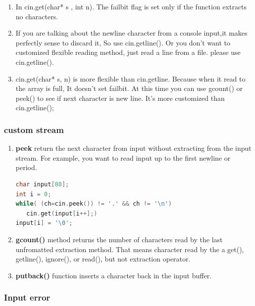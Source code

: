 \documentclass[a4paper,12pt,twoside]{book}
\begin{document}
\begin{itemize}
\begin{enumerate}
\item In cin.get(char* s ,  int n). The failbit flag is set only if the function extracts no characters.

\item If you are talking about the newline character from a console input,it makes perfectly sense to discard it, So use cin.getline(). Or you don't want to customized flexible reading method, just read a line from a file. please use cin.getline().

\item cin.get(char* s, n) is more flexible than cin.getline. Because when it read to the array is full, It doesn't set failbit. At this time you can use gcount() or peek() to see if next character is new line. It's more customized than  cin.getline();
\end{enumerate}

\end{itemize}

\subsubsection{custom stream}
\begin{enumerate}
\item \textbf{peek} return the next character from input without extracting from the input stream. For example, you want to read input up to the first newline or period.
\begin{lstlisting}[frame=single, language=c++]
char input[80];
int i = 0;
while( (ch=cin.peek()) != '.' && ch != '\n')
   cin.get(input[i++];)
input[i] = '\0';
\end{lstlisting}

\item \textbf{gcount()} method returns the number of characters read by the last unfromatted extraction method. That means character read by the a get(), getline(), ignore(), or read(), but not extraction operator.

\item \textbf{putback()} function inserts a character back in the input buffer.
\end{enumerate}


\subsubsection{Input error}
\end{document}
